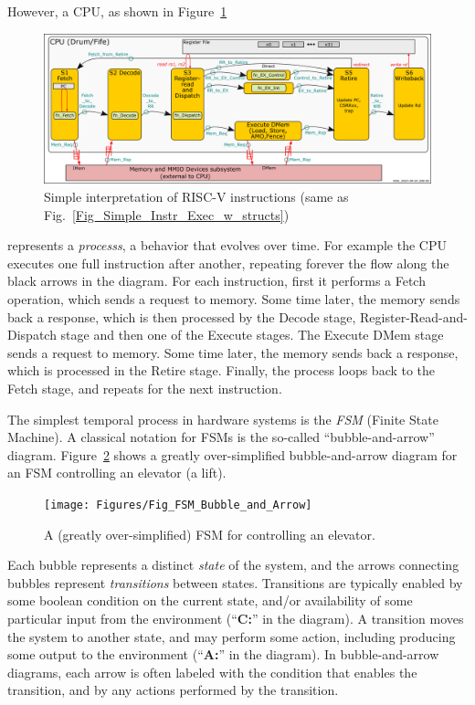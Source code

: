 However, a CPU, as shown in Figure~\ref{Fig_FSMs_Simple_Instr_Exec}
\begin{figure}[htbp]
  \centerline{\includegraphics[width=6in,angle=0]{Figures/RSN_2025-09-01.000.00_FifeDrum_Stages_Multilayer_L1_L3}}
  \caption{\label{Fig_FSMs_Simple_Instr_Exec}
           Simple interpretation of RISC-V instructions
	   (same as Fig.~\ref{Fig_Simple_Instr_Exec_w_structs})}
\end{figure}
represents a \emph{processs}, a behavior that evolves over time.  For
example the {\DRUM} CPU executes one full instruction after another,
repeating forever the flow along the black arrows in the diagram. For
each instruction, first it performs a Fetch operation, which sends a
request to memory. Some time later, the memory sends back a response,
which is then processed by the Decode stage,
Register-Read-and-Dispatch stage and then one of the Execute stages.
The Execute DMem stage sends a request to memory. Some time later, the
memory sends back a response, which is processed in the Retire stage.
Finally, the process loops back to the Fetch stage, and repeats for
the next instruction.

The simplest temporal process in hardware systems is the \emph{FSM}
(Finite State Machine).  A classical notation for FSMs is the
so-called ``bubble-and-arrow'' diagram.
Figure~\ref{Fig_FSM_Bubble_and_Arrow} shows a greatly over-simplified
bubble-and-arrow diagram for an FSM controlling an elevator (a lift).
\begin{figure}[htbp]
  \centerline{\texttt{[image: Figures/Fig\_FSM\_Bubble\_and\_Arrow]}}
  \caption{\label{Fig_FSM_Bubble_and_Arrow}
           A (greatly over-simplified) FSM for controlling an elevator.}
\end{figure}
Each bubble represents a distinct \emph{state} of the system, and the
arrows connecting bubbles represent \emph{transitions} between states.
Transitions are typically enabled by some boolean condition on the
current state, and/or availability of some particular input from the
environment (``{\bf C:}'' in the diagram).  A transition moves the
system to another state, and may perform some action, including
producing some output to the environment (``{\bf A:}'' in the
diagram).  In bubble-and-arrow diagrams, each arrow is often labeled
with the condition that enables the transition, and by any actions
performed by the transition.

